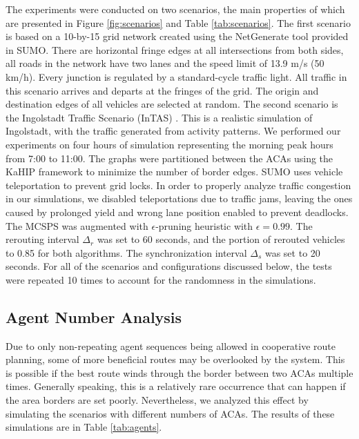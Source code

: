 \documentclass[sigconf]{aamas}
\begin{document}
The experiments were conducted on two scenarios, the main properties of which are presented in Figure \ref{fig:scenarios} and Table \ref{tab:scenarios}. The first scenario is based on a 10-by-15 grid network created using the NetGenerate tool provided in SUMO. There are horizontal fringe edges at all intersections from both sides, all roads in the network have two lanes and the speed limit of 13.9 m/s (50 km/h). Every junction is regulated by a standard-cycle traffic light. All traffic in this scenario arrives and departs at the fringes of the grid. The origin and destination edges of all vehicles are selected at random. The second scenario is the Ingolstadt Traffic Scenario (InTAS) \cite{InTAS}. This is a realistic simulation of Ingolstadt, with the traffic generated from activity patterns. We performed our experiments on four hours of simulation representing the morning peak hours from 7:00 to 11:00. The graphs were partitioned between the ACAs using the KaHIP framework \cite{kahip} to minimize the number of border edges. SUMO uses vehicle teleportation to prevent grid locks. In order to properly analyze traffic congestion in our simulations, we disabled teleportations due to traffic jams, leaving the ones caused by prolonged yield and wrong lane position enabled to prevent deadlocks. The MCSPS was augmented with $\epsilon$-pruning heuristic \cite{heur_t-kPC-MLS} with $\epsilon=0.99$. The rerouting interval $\Delta_r$ was set to 60 seconds, and the portion of rerouted vehicles to 0.85 for both algorithms. The synchronization interval $\Delta_s$ was set to 20 seconds. For all of the scenarios and configurations discussed below, the tests were repeated 10 times to account for the randomness in the simulations.

\subsection{Agent Number Analysis}
Due to only non-repeating agent sequences being allowed in cooperative route planning, some of more beneficial routes may be overlooked by the system. This is possible if the best route winds through the border between two ACAs multiple times. Generally speaking, this is a relatively rare occurrence that can happen if the area borders are set poorly. Nevertheless, we analyzed this effect by simulating the scenarios with different numbers of ACAs. The results of these simulations are in Table \ref{tab:agents}.
\end{document}

